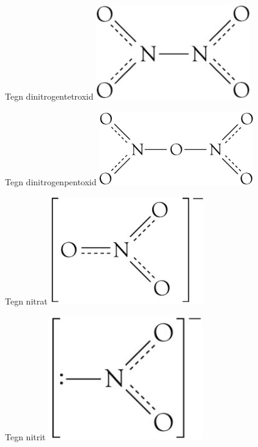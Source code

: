 \begin{flashcard}[Struktur]{Tegn dinitrogentetroxid}
\includegraphics[width=0.5\textwidth]{figures/k15s383Dinitrogentetroxid.png}
\end{flashcard}

\begin{flashcard}[Struktur]{Tegn dinitrogenpentoxid}
\includegraphics[width=0.5\textwidth]{figures/k15s383Dinitrogenpentoxid.png}
\end{flashcard}

\begin{flashcard}[Struktur]{Tegn nitrat}
\includegraphics[width=0.5\textwidth]{figures/k15s383Nitrat.png}
\end{flashcard}

\begin{flashcard}[Struktur]{Tegn nitrit}
\includegraphics[width=0.5\textwidth]{figures/k15s385Nitrit.png}
\end{flashcard}


